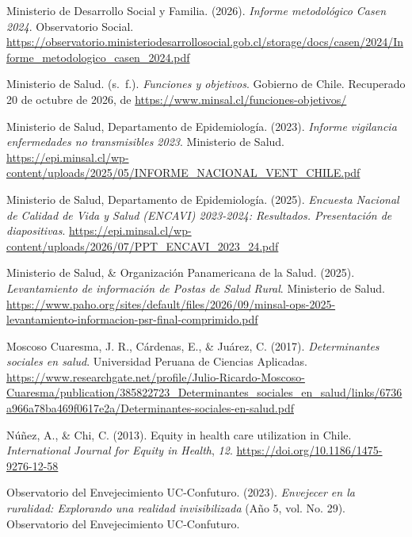\documentclass[
  spanish,
  a4paper,
  oneside]{scrbook}
\newlength{\cslhangindent}
\newenvironment{CSLReferences}[2] %
 {\begin{list}{}{%
  \setlength{\itemindent}{0pt}
  \setlength{\leftmargin}{0pt}
  \setlength{\parsep}{0pt}
  \ifodd #1
   \setlength{\leftmargin}{\cslhangindent}
   \setlength{\itemindent}{-1\cslhangindent}
  \fi
  \setlength{\itemsep}{#2\baselineskip}}}
 {\end{list}}
\begin{document}
\begin{CSLReferences}{1}{0}
Ministerio de Desarrollo Social y Familia. (2026). \emph{Informe
metodológico Casen 2024}. Observatorio Social.
\url{https://observatorio.ministeriodesarrollosocial.gob.cl/storage/docs/casen/2024/Informe_metodologico_casen_2024.pdf}

Ministerio de Salud. (s.~f.). \emph{Funciones y objetivos}. Gobierno de
Chile. Recuperado 20 de octubre de 2026, de
\url{https://www.minsal.cl/funciones-objetivos/}

Ministerio de Salud, Departamento de Epidemiología. (2023).
\emph{Informe vigilancia enfermedades no transmisibles 2023}. Ministerio
de Salud.
\url{https://epi.minsal.cl/wp-content/uploads/2025/05/INFORME_NACIONAL_VENT_CHILE.pdf}

Ministerio de Salud, Departamento de Epidemiología. (2025).
\emph{Encuesta Nacional de Calidad de Vida y Salud ({ENCAVI}) 2023-2024:
Resultados. Presentación de diapositivas}.
\url{https://epi.minsal.cl/wp-content/uploads/2026/07/PPT_ENCAVI_2023_24.pdf}

Ministerio de Salud, \& Organización Panamericana de la Salud. (2025).
\emph{Levantamiento de información de Postas de Salud Rural}. Ministerio
de Salud.
\url{https://www.paho.org/sites/default/files/2026/09/minsal-ops-2025-levantamiento-informacion-psr-final-comprimido.pdf}

Moscoso Cuaresma, J. R., Cárdenas, E., \& Juárez, C. (2017).
\emph{Determinantes sociales en salud}. Universidad Peruana de Ciencias
Aplicadas.
\url{https://www.researchgate.net/profile/Julio-Ricardo-Moscoso-Cuaresma/publication/385822723_Determinantes_sociales_en_salud/links/6736a966a78ba469f0617e2a/Determinantes-sociales-en-salud.pdf}

Núñez, A., \& Chi, C. (2013). Equity in health care utilization in
{Chile}. \emph{International Journal for Equity in Health}, \emph{12}.
\url{https://doi.org/10.1186/1475-9276-12-58}

Observatorio del Envejecimiento UC-Confuturo. (2023). \emph{Envejecer en
la ruralidad: Explorando una realidad invisibilizada} (Año 5, vol. No.
29). Observatorio del Envejecimiento UC-Confuturo.


\end{CSLReferences}
\end{document}
